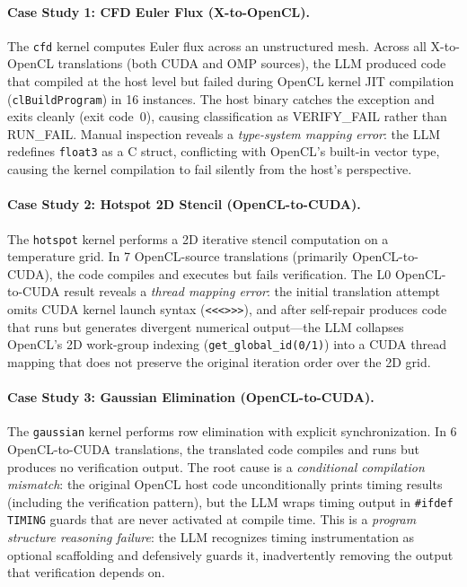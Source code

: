 \documentclass{article}
\newcommand{\runfail}{\textsc{RUN\_FAIL}}
\newcommand{\verifyfail}{\textsc{VERIFY\_FAIL}}
\begin{document}
\paragraph{Case Study 1: CFD Euler Flux (X-to-OpenCL).}
The \texttt{cfd} kernel computes Euler flux across an unstructured mesh.
Across all X-to-OpenCL translations (both CUDA and OMP sources),
the LLM produced code that compiled at the host level but failed
during OpenCL kernel JIT compilation (\texttt{clBuildProgram}) in 16
instances. The host binary catches the exception and exits cleanly
(exit code~0), causing classification as \verifyfail{}{} rather than
\runfail{}. Manual inspection reveals a \emph{type-system mapping error}:
the LLM redefines \texttt{float3} as a C struct, conflicting with
OpenCL's built-in vector type, causing the kernel compilation to fail
silently from the host's perspective.

\paragraph{Case Study 2: Hotspot 2D Stencil (OpenCL-to-CUDA).}
The \texttt{hotspot} kernel performs a 2D iterative stencil computation
on a temperature grid. In 7 OpenCL-source translations (primarily
OpenCL-to-CUDA), the code compiles and executes but fails
verification. The L0 OpenCL-to-CUDA result reveals a \emph{thread
mapping error}: the initial translation attempt omits CUDA kernel
launch syntax (\texttt{<<<>>>}), and after self-repair produces code
that runs but generates divergent numerical output---the LLM
collapses OpenCL's 2D work-group indexing
(\texttt{get\_global\_id(0/1)}) into a CUDA thread mapping that
does not preserve the original iteration order over the 2D grid.

\paragraph{Case Study 3: Gaussian Elimination (OpenCL-to-CUDA).}
The \texttt{gaussian} kernel performs row elimination with explicit
synchronization. In 6 OpenCL-to-CUDA translations, the translated
code compiles and runs but produces no verification output.
The root cause is a \emph{conditional compilation mismatch}: the
original OpenCL host code unconditionally prints timing results
(including the verification pattern), but the LLM wraps timing
output in \texttt{\#ifdef TIMING} guards that are never activated
at compile time. This is a \emph{program structure reasoning failure}:
the LLM recognizes timing instrumentation as optional scaffolding
and defensively guards it, inadvertently removing the output
that verification depends on.
\end{document}
